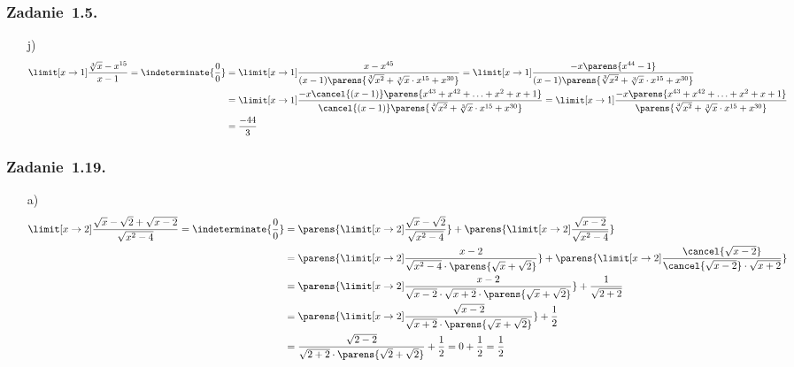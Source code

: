 \subsubsection*{Zadanie~1.5.}
\begin{itemize}
    \item[j)]
        \begin{equation*}
            \begin{split}
                \limit[x \to 1] \frac{\sqrt[3]{x} - x^{15}}{x - 1} = \indeterminate{\frac{0}{0}}
                    &= \limit[x \to 1] \frac{x - x^{45}}{(x - 1)\parens{\sqrt[3]{x^2} + \sqrt[3]{x} \cdot x^{15} + x^{30}}}
                    = \limit[x \to 1] \frac{-x \parens{x^{44} - 1}}{(x - 1)\parens{\sqrt[3]{x^2} + \sqrt[3]{x} \cdot x^{15} + x^{30}}}\\
                    &= \limit[x \to 1] \frac{-x\cancel{(x - 1)}\parens{x^{43} + x^{42} + \ldots + x^2 + x + 1}}{\cancel{(x - 1)}\parens{\sqrt[3]{x^2} + \sqrt[3]{x} \cdot x^{15} + x^{30}}}
                    = \limit[x \to 1] \frac{-x\parens{x^{43} + x^{42} + \ldots + x^2 + x + 1}}{\parens{\sqrt[3]{x^2} + \sqrt[3]{x} \cdot x^{15} + x^{30}}}\\
                    &= \frac{-44}{3}
            \end{split}
        \end{equation*}
\end{itemize}
\subsubsection*{Zadanie~1.19.}
\begin{itemize}
    \item[a)]
        \begin{equation*}
            \begin{split}
                \limit[x \to 2] \frac{\sqrt{x} - \sqrt{2} + \sqrt{x - 2}}{\sqrt{x^2 - 4}}
                    = \indeterminate{\frac{0}{0}}
                    &= \parens{\limit[x \to 2] \frac{\sqrt{x} - \sqrt{2}}{\sqrt{x^2 - 4}}} + \parens{\limit[x \to 2] \frac{\sqrt{x - 2}}{\sqrt{x^2 - 4}}}\\
                    &= \parens{\limit[x \to 2] \frac{x - 2}{\sqrt{x^2 - 4} \cdot \parens{\sqrt{x} + \sqrt{2}}}} + \parens{\limit[x \to 2] \frac{\cancel{\sqrt{x - 2}}}{\cancel{\sqrt{x - 2}} \cdot \sqrt{x + 2}}}\\
                    &= \parens{\limit[x \to 2] \frac{x - 2}{\sqrt{x - 2} \cdot \sqrt{x + 2} \cdot \parens{\sqrt{x} + \sqrt{2}}}} + \frac{1}{\sqrt{2 + 2}}\\
                    &= \parens{\limit[x \to 2] \frac{\sqrt{x - 2}}{\sqrt{x + 2} \cdot \parens{\sqrt{x} + \sqrt{2}}}} + \frac{1}{2}\\
                    &= \frac{\sqrt{2 - 2}}{\sqrt{2 + 2} \cdot \parens{\sqrt{2} + \sqrt{2}}} + \frac{1}{2} = 0 + \frac{1}{2} = \frac{1}{2}
            \end{split}
        \end{equation*}
\end{itemize}

